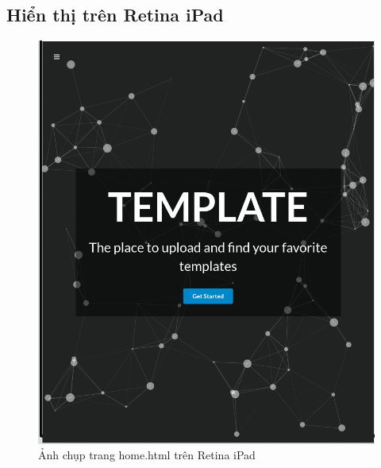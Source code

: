 \documentclass[a4paper]{article}
\begin{document}
\subsection{Hiển thị trên Retina iPad}
\begin{figure}[H]
\begin{center}
\includegraphics[page=1, scale=0.215]{screenshot/retina.png}
\caption{Ảnh chụp trang home.html trên Retina iPad}
\end{center}
\end{figure}
\end{document}
